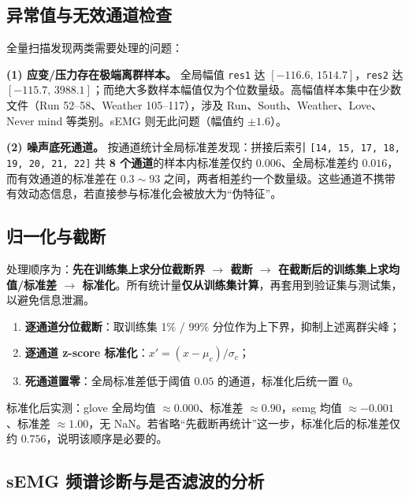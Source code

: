 \documentclass[11pt,a4paper]{ctexart}
\begin{document}
\subsection{异常值与无效通道检查}

全量扫描发现两类需要处理的问题：

\begin{sloppypar}
\textbf{(1) 应变/压力存在极端离群样本。} 全局幅值 \texttt{res1} 达 $[-116.6,\,1514.7]$，\texttt{res2} 达 $[-115.7,\,3988.1]$；而绝大多数样本幅值仅为个位数量级。高幅值样本集中在少数文件（Run 52--58、Weather 105--117），涉及 Run、South、Weather、Love、Never mind 等类别。sEMG 则无此问题（幅值约 $\pm1.6$）。
\end{sloppypar}

\textbf{(2) 噪声底死通道。} 按通道统计全局标准差发现：拼接后索引 \texttt{[14, 15, 17, 18, 19, 20, 21, 22]} 共 \textbf{8 个通道}的样本内标准差仅约 $0.006$、全局标准差约 $0.016$，而有效通道的标准差在 $0.3\sim93$ 之间，两者相差约一个数量级。这些通道不携带有效动态信息，若直接参与标准化会被放大为“伪特征”。

\subsection{归一化与截断}

处理顺序为：\textbf{先在训练集上求分位截断界 $\rightarrow$ 截断 $\rightarrow$ 在截断后的训练集上求均值/标准差 $\rightarrow$ 标准化}。所有统计量\textbf{仅从训练集计算}，再套用到验证集与测试集，以避免信息泄漏。

\begin{enumerate}[leftmargin=2em]
\item \textbf{逐通道分位截断}：取训练集 1\% / 99\% 分位作为上下界，抑制上述离群尖峰；
\item \textbf{逐通道 z-score 标准化}：$x' = (x-\mu_c)/\sigma_c$；
\item \textbf{死通道置零}：全局标准差低于阈值 $0.05$ 的通道，标准化后统一置 $0$。
\end{enumerate}

标准化后实测：glove 全局均值 $\approx0.000$、标准差 $\approx0.90$，semg 均值 $\approx-0.001$、标准差 $\approx1.00$，无 NaN。若省略“先截断再统计”这一步，标准化后的标准差仅约 $0.756$，说明该顺序是必要的。

\subsection{sEMG 频谱诊断与是否滤波的分析}
\end{document}

